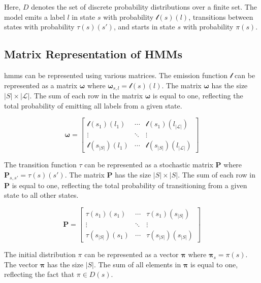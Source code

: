 Here, $D$ denotes the set of discrete probability distributions over a finite set.
The model emits a label $l$ in state $s$ with probability $\mathscr{l}(s)(l)$, transitions between states with probability $\tau(s)(s')$, and starts in state $s$ with probability $\pi(s)$.


\subsection{Matrix Representation of HMMs}\label{subsec:matrix-representation}
\glspl{hmm} can be represented using various matrices.
The emission function $\mathscr{l}$ can be represented as a matrix $\pmb{\omega}$ where $\pmb{\omega}_{s, l} = \mathscr{l}(s)(l)$.
The matrix $\pmb{\omega}$ has the size $|S| \times |\mathcal{L}|$.
The sum of each row in the matrix $\pmb{\omega}$ is equal to one, reflecting the total probability of emitting all labels from a given state.


\[
    \pmb{\omega} = \begin{bmatrix}
                 \mathscr{l}(s_1)(l_1)     & \cdots & \mathscr{l}(s_1)(l_{|\mathcal{L}|})     \\
                 \vdots                    & \ddots & \vdots                                  \\
                 \mathscr{l}(s_{|S|})(l_1) & \cdots & \mathscr{l}(s_{|S|})(l_{|\mathcal{L}|})
    \end{bmatrix}
\]


The transition function $\tau$ can be represented as a stochastic matrix $\pmb{P}$ where $\pmb{P}_{s, s'} = \tau(s)(s')$.
The matrix $\pmb{P}$ has the size $|S| \times |S|$.
The sum of each row in $\pmb{P}$ is equal to one, reflecting the total probability of transitioning from a given state to all other states.

\[
    \pmb{P} = \begin{bmatrix}
            \tau(s_1)(s_1)     & \cdots & \tau(s_1)(s_{|S|})     \\
            \vdots             & \ddots & \vdots                 \\
            \tau(s_{|S|})(s_1) & \cdots & \tau(s_{|S|})(s_{|S|})
    \end{bmatrix}
\]

The initial distribution $\pi$ can be represented as a vector $\pmb{\pi}$ where $\pmb{\pi}_s = \pi(s)$.
The vector $\pmb{\pi}$ has the size $|S|$.
The sum of all elements in $\pmb{\pi}$ is equal to one, reflecting the fact that $\pi \in D(s)$.


